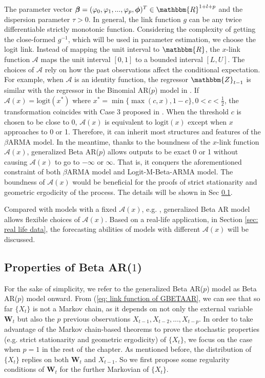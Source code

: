 \documentclass{article}
\theoremstyle{definition}
\begin{document}
The parameter vector $\bm{\beta} = (\varphi_0,\varphi_1,...,\varphi_p,\bm{\phi})^T \in \mathbbm{R}^{1+l+p}$ and the dispersion parameter $\tau>0$. In general, the link function $g$ can be any twice differentiable strictly monotonic function. Considering the complexity of getting the close-formed $g^{-1}$, which will be used in parameter estimation, we choose the logit link. Instead of mapping the unit interval to $\mathbbm{R}$, the $x$-link function $\mathcal{A}$ maps the unit interval $[0,1]$ to a bounded interval $[L,U]$. The choices of $\mathcal{A}$ rely on how the past observations affect the conditional expectation. For example, when $\mathcal{A}$ is an identity function, the regressor $\mathbbm{Z}_{t-1}$ is similar with the regressor in the Binomial AR($p$) model in \cite{Liu_2025}. If $\mathcal{A}(x) = \text{logit}(x^*)$ where $x^* = \min\{\max(c,x),1-c\}, 0<c<\frac{1}{2}$, the transformation coincides with Case 3 proposed in \cite{woodard2010stationarity}. When the threshold $c$ is chosen to be close to 0, $\mathcal{A}(x)$ is equivalent to $\text{logit}(x)$ except when $x$ approaches to 0 or 1. Therefore, it can inherit most structures and features of the $\beta$ARMA model. In the meantime, thanks to the boundness of the $x$-link function $\mathcal{A}(x)$, generalized Beta AR($p$) allows outputs to be exact 0 or 1 without causing $\mathcal{A}(x)$ to go to $-\infty$ or $\infty$. That is, it conquers the aforementioned constraint of both $\beta$ARMA model and Logit-M-Beta-ARMA model. The boundness of $\mathcal{A}(x)$ would be beneficial for the proofs of strict stationarity and geometric ergodicity of the process. The details will be shown in Sec \ref{sec: Properties of Generalized Beta AR($1$)}. 

Compared with models with a fixed $\mathcal{A}(x)$, e.g. \cite{rocha2009beta}, generalized Beta AR model allows flexible choices of $\mathcal{A}(x)$. Based on a real-life application, in Section \ref{sec: real life data}, the forecasting abilities of models with different $\mathcal{A}(x)$ will be discussed.
\subsection{Properties of Beta AR($1$)}
\label{sec: Properties of Generalized Beta AR($1$)}

For the sake of simplicity, we refer to the generalized Beta AR($p$) model as Beta AR($p$) model onward. From (\ref{eq: link function of GBETAAR}, we can see that so far $\{X_t\}$ is not a Markov chain, as it depends on not only the external variable $\bm{W}_t$ but also the $p$ previous observations $X_{t-1}, X_{t-2},...,X_{t-p}$. In order to take advantage of the Markov chain-based theorems to prove the stochastic properties (e.g. strict stationarity and geometric ergodicity) of $\{X_t\}$, we focus on the case when $p=1$ in the rest of the chapter. As mentioned before, the distribution of $\{X_t\}$ replies on both $\bm{W}_t$ and $X_{t-1}$. So we first propose some regularity conditions of $\bm{W}_t$ for the further Markovian of $\{X_t\}$.
\end{document}
